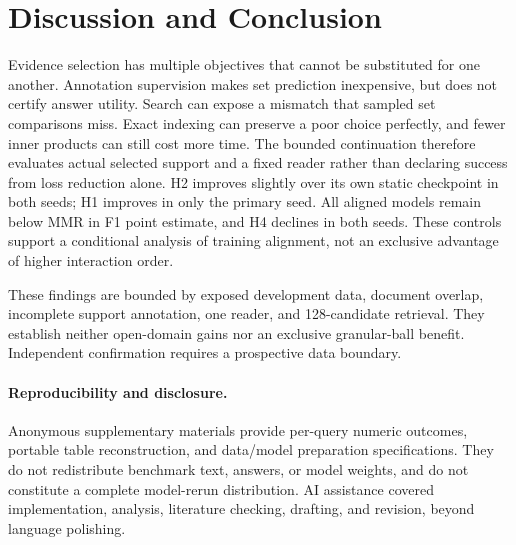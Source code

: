\documentclass[runningheads]{llncs}
\begin{document}
\section{Discussion and Conclusion}
Evidence selection has multiple objectives that cannot be substituted for
one another. Annotation supervision makes set prediction inexpensive, but
does not certify answer utility. Search can expose a mismatch that sampled
set comparisons miss. Exact indexing can preserve a poor choice perfectly,
and fewer inner products can still cost more time. The bounded continuation
therefore evaluates actual selected support and a fixed reader rather than
declaring success from loss reduction alone. H2 improves slightly over its
own static checkpoint in both seeds; H1 improves in only the primary seed.
All aligned models remain below MMR in F1 point estimate, and H4 declines
in both seeds. These controls support a conditional analysis of
training alignment, not an exclusive advantage of higher interaction order.

These findings are bounded by exposed development data, document overlap,
incomplete support annotation, one reader, and 128-candidate retrieval.
They establish neither open-domain gains nor an exclusive granular-ball
benefit. Independent confirmation requires a prospective data boundary.

\paragraph{Reproducibility and disclosure.}
Anonymous supplementary materials provide per-query numeric outcomes,
portable table reconstruction, and data/model preparation specifications.
They do not redistribute benchmark text, answers, or model weights, and do
not constitute a complete model-rerun distribution. AI assistance covered
implementation, analysis, literature checking, drafting, and revision,
beyond language polishing.

\clearpage


\end{document}

